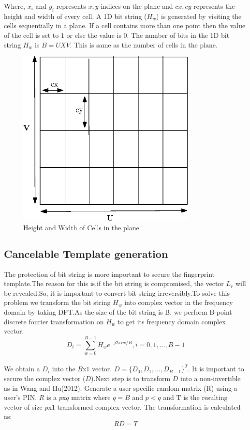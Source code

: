 \documentclass[14pt, oneside]{article}   	%
\begin{document}
Where, $x_i$ and $y_i$ represents $x,y$ indices on the plane and $cx,cy$ represents the height and width of every cell. A 1D bit string ($H_w$) is generated by visiting the cells sequentially in a plane. If a cell contains more than one point then the value of the cell is set to $1$ or else the value is $0$. The number of bits in the 1D bit string $H_w$ is $B=U X V$. This is same as the number of cells in the plane.
\begin{figure}[htbp]
\begin{center}
\includegraphics[width=90mm,scale=0.3]{hw_cells.eps}
\caption{Height and Width of Cells in the plane}
\end{center}
\end{figure} 
\subsection{Cancelable Template generation}
The protection of bit string is more important to secure the fingerprint template.The reason for this is,if the bit string is compromised, the vector $L_r$ will be revealed.So, it is important to convert bit string irreversibly.To solve this problem we transform the bit string $H_w$ into complex vector in the frequency domain by taking DFT.As the size of the bit string is B, we perform B-point discrete fourier transformation on $H_w$ to get its frequency domain complex vector.\\
\begin{equation}
D_i=\sum_{w=0}^{B -1} H_w e^{-j2\pi iw/B} , i=0,1,\ldots,B-1
\end{equation}
\\
We obtain a $D_i$ into the $B$x$1$ vector. $D=\{D_0,D_1,\ldots,D_{B-1}\}^{T}$. It is important to secure the complex vector ($D$).Next step is to transform $D$ into a non-invertible as in Wang and Hu(2012). Generate a user specific random matrix (R) using a user's PIN. $R$ is a $p$x$q$ matrix where $q=B$ and $p<q$ and T is the resulting vector of size $p$x$1$ transformed complex vector. The transformation is calculated as:\\
\begin{equation}
RD=T
\end{equation}
\end{document}
